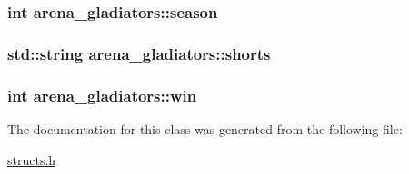 \hypertarget{classarena__gladiators_a45308edb01250c153c628713bc14e5f4}{
\subsubsection[{season}]{\setlength{\rightskip}{0pt plus 5cm}int arena\-\_\-gladiators\-::season}}\label{classarena__gladiators_a45308edb01250c153c628713bc14e5f4}
\hypertarget{classarena__gladiators_a280427370690bf3901a8f10608956bcc}{
\subsubsection[{shorts}]{\setlength{\rightskip}{0pt plus 5cm}std\-::string arena\-\_\-gladiators\-::shorts}}\label{classarena__gladiators_a280427370690bf3901a8f10608956bcc}
\hypertarget{classarena__gladiators_aa60a43b4f54e94e1df157113274ac496}{
\subsubsection[{win}]{\setlength{\rightskip}{0pt plus 5cm}int arena\-\_\-gladiators\-::win}}\label{classarena__gladiators_aa60a43b4f54e94e1df157113274ac496}


The documentation for this class was generated from the following file\-:\begin{DoxyCompactItemize}
\item 
\hyperlink{structs_8h}{structs.\-h}\end{DoxyCompactItemize}
